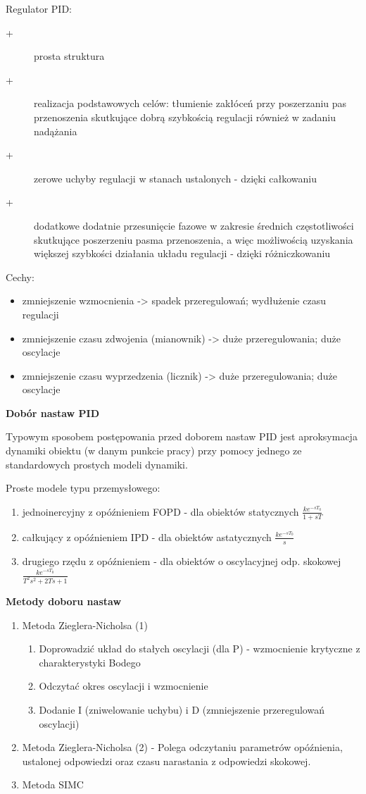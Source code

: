Regulator PID:
\begin{description}
    \item[+] prosta struktura
    \item[+] realizacja podstawowych celów: tłumienie zakłóceń przy poszerzaniu pas przenoszenia skutkujące dobrą szybkością regulacji również w zadaniu nadążania
    \item[+] zerowe uchyby regulacji w stanach ustalonych - dzięki całkowaniu
    \item[+] dodatkowe dodatnie przesunięcie fazowe w zakresie średnich częstotliwości skutkujące poszerzeniu pasma przenoszenia, a więc możliwością uzyskania większej szybkości działania układu regulacji - dzięki różniczkowaniu
\end{description}

Cechy:
\begin{itemize}
    \item zmniejszenie wzmocnienia -> spadek przeregulowań; wydłużenie czasu regulacji
    \item zmniejszenie czasu zdwojenia (mianownik) -> duże przeregulowania; duże oscylacje
    \item zmniejszenie czasu wyprzedzenia (licznik) -> duże przeregulowania; duże oscylacje
\end{itemize}

\textbf{Dobór nastaw PID}

Typowym sposobem postępowania przed doborem nastaw PID jest aproksymacja dynamiki obiektu (w danym punkcie pracy) przy pomocy jednego ze standardowych prostych modeli dynamiki.

Proste modele typu przemysłowego:
\begin{enumerate}
    \item jednoinercyjny z opóźnieniem FOPD - dla obiektów statycznych $\frac{ke^{-sT_0}}{1+sT}$
    \item całkujący z opóźnieniem IPD - dla obiektów astatycznych $\frac{ke^{-sT_0}}{s}$
    \item drugiego rzędu z opóźnieniem - dla obiektów o oscylacyjnej odp. skokowej $\frac{ke^{-sT_0}}{T^2s^2+2Ts+1}$
\end{enumerate}

\textbf{Metody doboru nastaw}
\begin{enumerate}
    \item Metoda Zieglera-Nicholsa (1)
    \begin{enumerate}
        \item Doprowadzić układ do stałych oscylacji (dla P) - wzmocnienie krytyczne z charakterystyki Bodego
        \item Odczytać okres oscylacji i wzmocnienie
        \item Dodanie I (zniwelowanie uchybu) i D (zmniejszenie przeregulowań oscylacji)
    \end{enumerate}
    \item Metoda Zieglera-Nicholsa (2) - Polega odczytaniu parametrów opóźnienia, ustalonej odpowiedzi oraz czasu narastania z odpowiedzi skokowej.
    \item Metoda SIMC
\end{enumerate}


